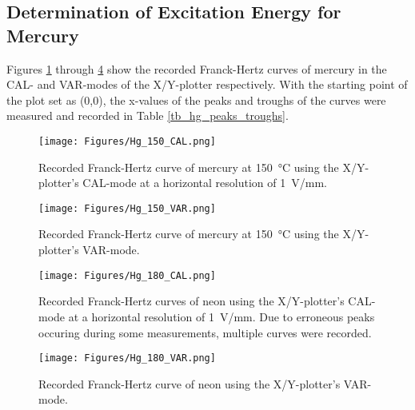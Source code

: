 \documentclass[titlepage]{article}
\begin{document}
\subsection{Determination of Excitation Energy for Mercury} \label{ssec_neon_results}
Figures \ref{fig_hg_150_CAL} through \ref{fig_hg_180_VAR} show the recorded Franck-Hertz curves of mercury in the CAL- and VAR-modes of the X/Y-plotter respectively. With the starting point of the plot set as (0,0), the x-values of the peaks and troughs of the curves were measured and recorded in Table \ref{tb_hg_peaks_troughs}.
%
\begin{figure}[H]
    \centering
    \texttt{[image: Figures/Hg\_150\_CAL.png]}
    \caption{Recorded Franck-Hertz curve of mercury at 150~°C using the X/Y-plotter's CAL-mode at a horizontal resolution of 1~V/mm.}
    \label{fig_hg_150_CAL}
\end{figure}
%
\begin{figure}[H]
    \centering
    \texttt{[image: Figures/Hg\_150\_VAR.png]}
    \caption{Recorded Franck-Hertz curve of mercury at 150~°C using the X/Y-plotter's VAR-mode.}
    \label{fig_hg_150_VAR}
\end{figure}
%
\begin{figure}[H]
    \centering
    \texttt{[image: Figures/Hg\_180\_CAL.png]}
    \caption{Recorded Franck-Hertz curves of neon using the X/Y-plotter's CAL-mode at a horizontal resolution of 1~V/mm. Due to erroneous peaks occuring during some measurements, multiple curves were recorded.}
    \label{fig_hg_180_CAL}
\end{figure}
%
\begin{figure}[H]
    \centering
    \texttt{[image: Figures/Hg\_180\_VAR.png]}
    \caption{Recorded Franck-Hertz curve of neon using the X/Y-plotter's VAR-mode.}
    \label{fig_hg_180_VAR}
\end{figure}
%
\end{document}
